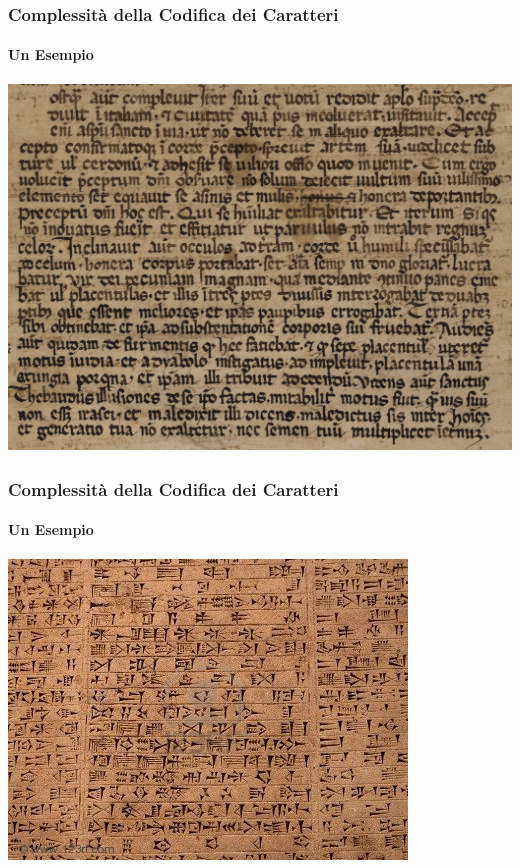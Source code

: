 \begin{frame}
	\frametitle{Complessità della Codifica dei Caratteri}
	\framesubtitle{Un Esempio}
	\addtocounter{nframe}{1}

	\begin{center}
		\includegraphics[width=.9\textwidth]{imgs/SnippetRotulo.jpg}
	\end{center}

\end{frame}

\begin{frame}
	\frametitle{Complessità della Codifica dei Caratteri}
	\framesubtitle{Un Esempio}
	\addtocounter{nframe}{1}

	\begin{center}
		\includegraphics[width=.9\textwidth]{imgs/tavolettaArgilla.jpg}
	\end{center}

\end{frame}


